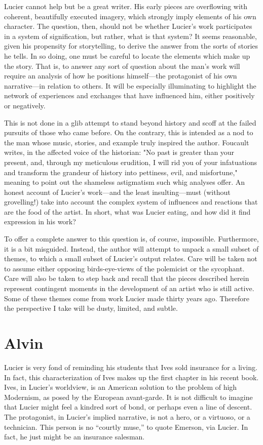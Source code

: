 \documentclass[a4paper,10pt]{report}
\numberwithin{equation}{section}
\begin{document}
Lucier cannot help but be a great writer. His early pieces are overflowing with coherent, beautifully executed imagery, which strongly imply elements of his own character. The question, then, should not be whether Lucier's work participates in a system of signification, but rather, what is that system? It seems reasonable, given his propensity for storytelling, to derive the answer from the sorts of stories he tells. In so doing, one must be careful to locate the elements which make up the story. That is, to answer any sort of question about the man's work will require an analysis of how he positions himself---the protagonist of his own narrative---in relation to others. It will be especially illuminating to highlight the network of experiences and exchanges that have influenced him, either positively or negatively. 

This is not done in a glib attempt to stand beyond history and scoff at the failed pursuits of those who came before. On the contrary, this is intended as a nod to the man whose music, stories, and example truly inspired the author. Foucault writes, in the affected voice of the historian: "No past is greater than your present, and, through my meticulous erudition, I will rid you of your infatuations and transform the grandeur of history into pettiness, evil, and misfortune,"\cite[p.~91]{Foucalt1984} meaning to point out the shameless astigmatism such whig analyses offer. An honest account of Lucier's work---and the least insulting---must (without grovelling!) take into account the complex system of influences and reactions that are the food of the artist. In short, what was Lucier eating, and how did it find expression in his work?

To offer a complete answer to this question is, of course, impossible. Furthermore, it is a bit misguided. Instead, the author will attempt to unpack a small subset of themes, to which a small subset of Lucier's output relates. Care will be taken not to assume either opposing birds-eye-views of the polemicist or the sycophant. Care will also be taken to step back and recall that the pieces described herein represent contingent moments in the development of an artist who is still active. Some of these themes come from work Lucier made thirty years ago. Therefore the perspective I take will be dusty, limited, and subtle. 

\section{Alvin}
 Lucier is very fond of reminding his students that Ives sold insurance for a living. In fact, this characterization of Ives makes up the first chapter in his recent book. Ives, in Lucier's worldview, is an American solution to the problem of high Modernism, as posed by the European avant-garde.\cite[p.~3]{lucier2012} It is not difficult to imagine that Lucier might feel a kindred sort of bond, or perhaps even a line of descent. The protagonist, in Lucier's implied narrative, is not a hero, or a virtuoso, or a technician. This person is no ``courtly muse,'' to quote Emerson, via Lucier. In fact, he just might be an insurance salesman.\cite[p.~3]{lucier2012} 
\end{document}
